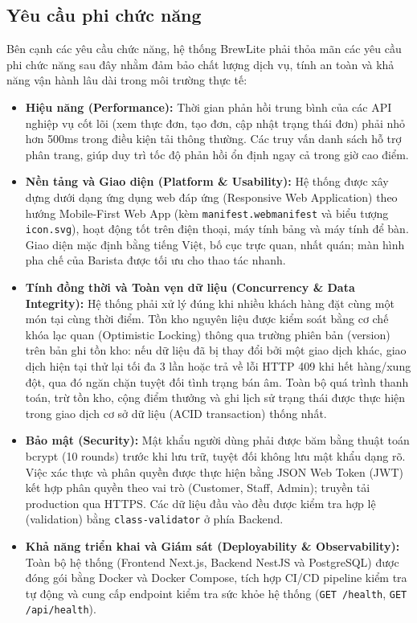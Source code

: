\documentclass[12pt,a4paper]{report}
\begin{document}
\subsection{Yêu cầu phi chức năng}

Bên cạnh các yêu cầu chức năng, hệ thống BrewLite phải thỏa mãn các yêu cầu phi chức năng sau đây nhằm đảm bảo chất lượng dịch vụ, tính an toàn và khả năng vận hành lâu dài trong môi trường thực tế:

\begin{itemize}[leftmargin=*]
\item \textbf{Hiệu năng (Performance):} Thời gian phản hồi trung bình của các API nghiệp vụ cốt lõi (xem thực đơn, tạo đơn, cập nhật trạng thái đơn) phải nhỏ hơn 500ms trong điều kiện tải thông thường. Các truy vấn danh sách hỗ trợ phân trang, giúp duy trì tốc độ phản hồi ổn định ngay cả trong giờ cao điểm.
\item \textbf{Nền tảng và Giao diện (Platform \& Usability):} Hệ thống được xây dựng dưới dạng ứng dụng web đáp ứng (Responsive Web Application) theo hướng Mobile-First Web App (kèm \texttt{manifest.webmanifest} và biểu tượng \texttt{icon.svg}), hoạt động tốt trên điện thoại, máy tính bảng và máy tính để bàn. Giao diện mặc định bằng tiếng Việt, bố cục trực quan, nhất quán; màn hình pha chế của Barista được tối ưu cho thao tác nhanh.
\item \textbf{Tính đồng thời và Toàn vẹn dữ liệu (Concurrency \& Data Integrity):} Hệ thống phải xử lý đúng khi nhiều khách hàng đặt cùng một món tại cùng thời điểm. Tồn kho nguyên liệu được kiểm soát bằng cơ chế khóa lạc quan (Optimistic Locking) thông qua trường phiên bản (version) trên bản ghi tồn kho: nếu dữ liệu đã bị thay đổi bởi một giao dịch khác, giao dịch hiện tại thử lại tối đa 3 lần hoặc trả về lỗi HTTP 409 khi hết hàng/xung đột, qua đó ngăn chặn tuyệt đối tình trạng bán âm. Toàn bộ quá trình thanh toán, trừ tồn kho, cộng điểm thưởng và ghi lịch sử trạng thái được thực hiện trong giao dịch cơ sở dữ liệu (ACID transaction) thống nhất.
\item \textbf{Bảo mật (Security):} Mật khẩu người dùng phải được băm bằng thuật toán bcrypt (10 rounds) trước khi lưu trữ, tuyệt đối không lưu mật khẩu dạng rõ. Việc xác thực và phân quyền được thực hiện bằng JSON Web Token (JWT) kết hợp phân quyền theo vai trò (Customer, Staff, Admin); truyền tải production qua HTTPS. Các dữ liệu đầu vào đều được kiểm tra hợp lệ (validation) bằng \texttt{class-validator} ở phía Backend.
\item \textbf{Khả năng triển khai và Giám sát (Deployability \& Observability):} Toàn bộ hệ thống (Frontend Next.js, Backend NestJS và PostgreSQL) được đóng gói bằng Docker và Docker Compose, tích hợp CI/CD pipeline kiểm tra tự động và cung cấp endpoint kiểm tra sức khỏe hệ thống (\texttt{GET /health}, \texttt{GET /api/health}).
\end{itemize}
\end{document}
